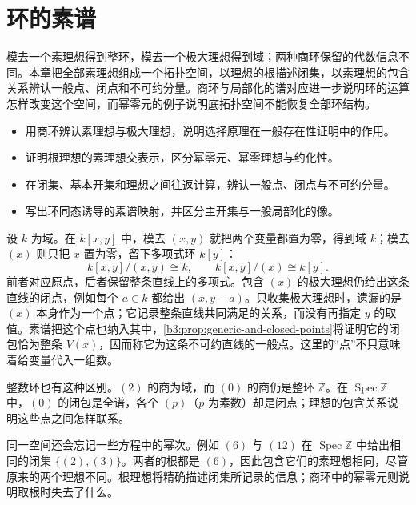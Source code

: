 
\chapter{环的素谱}
\label{b3:ch:01}

\begin{chapterabstract}
	模去一个素理想得到整环，模去一个极大理想得到域；两种商环保留的代数信息不同。本章把全部素理想组成一个拓扑空间，以理想的根描述闭集，以素理想的包含关系辨认一般点、闭点和不可约分量。商环与局部化的谱对应进一步说明环的运算怎样改变这个空间，而幂零元的例子说明底拓扑空间不能恢复全部环结构。
\end{chapterabstract}

\begin{learninggoals}
	\begin{itemize}
		\item 用商环辨认素理想与极大理想，说明选择原理在一般存在性证明中的作用。
		\item 证明根理想的素理想交表示，区分幂零元、幂零理想与约化性。
		\item 在闭集、基本开集和理想之间往返计算，辨认一般点、闭点与不可约分量。
		\item 写出环同态诱导的素谱映射，并区分主开集与一般局部化的像。
	\end{itemize}
\end{learninggoals}

设 \(k\) 为域。在 \(k[x,y]\) 中，模去 \((x,y)\) 就把两个变量都置为零，得到域 \(k\)；模去 \((x)\) 则只把 \(x\) 置为零，留下多项式环 \(k[y]\)：
\[
	k[x,y]/(x,y)\cong k,\qquad k[x,y]/(x)\cong k[y].
\]
前者对应原点，后者保留整条直线上的多项式。包含 \((x)\) 的极大理想仍给出这条直线的闭点，例如每个 \(a\in k\) 都给出 \((x,y-a)\)。只收集极大理想时，遗漏的是 \((x)\) 本身作为一个点；它记录整条直线共同满足的关系，而没有再指定 \(y\) 的取值。素谱把这个点也纳入其中，\cref{b3:prop:generic-and-closed-points}将证明它的闭包恰为整条 \(V(x)\)，因而称它为这条不可约直线的一般点。这里的“点”不只意味着给变量代入一组数。

\ProseParagraphBreak
整数环也有这种区别。\((2)\) 的商为域，而 \((0)\) 的商仍是整环 \(\mathbb Z\)。在 \(\operatorname{Spec}\mathbb Z\) 中，\((0)\) 的闭包是全谱，各个 \((p)\)（\(p\) 为素数）却是闭点；理想的包含关系说明这些点之间怎样联系。

\ProseParagraphBreak

同一空间还会忘记一些方程中的幂次。例如 \((6)\) 与 \((12)\) 在 \(\operatorname{Spec}\mathbb Z\) 中给出相同的闭集 \(\{(2),(3)\}\)。两者的根都是 \((6)\)，因此包含它们的素理想相同，尽管原来的两个理想不同。根理想将精确描述闭集所记录的信息；商环中的幂零元则说明取根时失去了什么。

